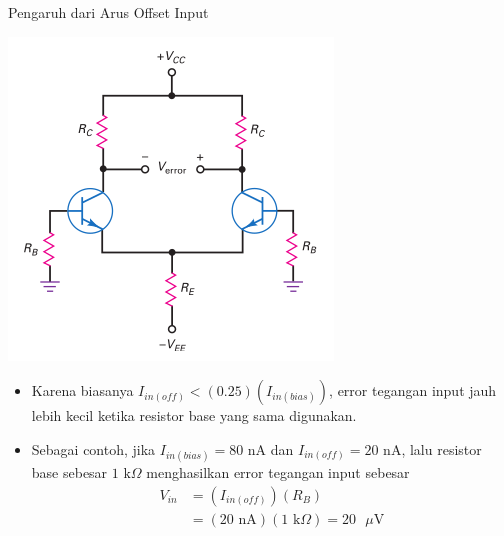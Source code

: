 \documentclass[aspectratio=169]{beamer}
\begin{document}
\begin{frame}{Pengaruh dari Arus Offset Input}
	\begin{multicols}{2}
		\begin{center}
			\includegraphics[height=0.7\textheight]{gambar/01.equal_base_resistance_on_other_side_reduces_error}
		\end{center}
		\columnbreak
		\begin{itemize}
			\item Karena biasanya $ I_{in(off)}  < (0.25)( I_{in(bias)})$, error tegangan input jauh lebih kecil ketika resistor base yang sama digunakan.
			\item Sebagai contoh, jika $ I_{in(bias)} = 80 \text{ nA} $ dan $ I_{in(off)} = 20 \text{ nA} $, lalu resistor base sebesar $ 1 \text{ k}\Omega $ menghasilkan error tegangan input sebesar
			\begin{align*}
				V_{in} &= (I_{in(off)})(R_B) \\
				&= (20 \text{ nA})(1 \text{ k}\Omega) = 20 \text{ }\mu\text{V}\\
			\end{align*}
		\end{itemize}
	\end{multicols}
\end{frame}
\end{document}
